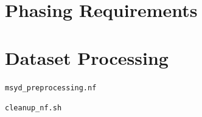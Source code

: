 \section*{Phasing Requirements}
\label{app:covcalc}



\newpage
\section*{Dataset Processing}
\label{app:dataset}

\vspace{2em}

\texttt{msyd\_preprocessing.nf}

\texttt{cleanup\_nf.sh}

